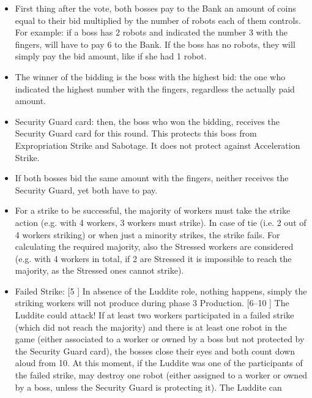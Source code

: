         \begin{itemize}
            \item First thing after the vote, both bosses pay to the Bank an amount of coins
            equal to their bid multiplied by the number of robots each of them controls.
            For example: if a boss has 2 robots and indicated the number 3 with
            the fingers, will have to pay 6 to the Bank. If the boss has no robots, they will
            simply pay the bid amount, like if she had 1 robot.
            \item The winner of the bidding is the boss with the highest bid: the one who
            indicated the highest number with the fingers, regardless the actually paid
            amount.
            \item Security Guard card: then, the boss who won the bidding, receives the Security
            Guard card for this round. This protects this boss from Expropriation
            Strike and Sabotage. It does not protect against Acceleration Strike.
            \item If both bosses bid the same amount with the fingers, neither receives the
            Security Guard, yet both have to pay.
            \item For a strike to be successful, the majority of workers must take the strike
            action (e.g. with 4 workers, 3 workers must strike). In case of tie (i.e. 2 out of
            4 workers striking) or when just a minority strikes, the strike fails. For calculating
            the required majority, also the Stressed workers are considered (e.g. with
            4 workers in total, if 2 are Stressed it is impossible to reach the majority, as
            the Stressed ones cannot strike).
            \item Failed Strike: [5 \faPeopleGroup] In absence of the Luddite role, nothing happens, simply
            the striking workers will not produce during phase 3 Production. [6–10 \faPeopleGroup]
            The Luddite could attack! If at least two workers participated in a failed
            strike (which did not reach the majority) and there is at least one robot in the
            game (either associated to a worker or owned by a boss but not protected
            by the Security Guard card), the bosses close their eyes and both count down
            aloud from 10. At this moment, if the Luddite was one of the participants
            of the failed strike, may destroy one robot (either assigned to a worker or
            owned by a boss, unless the Security Guard is protecting it). The Luddite can

\end{itemize}
